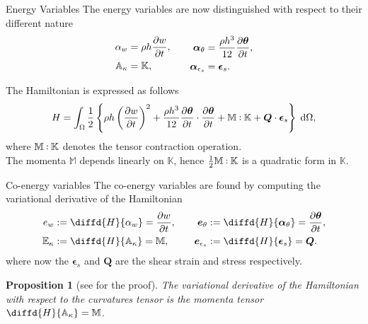 \documentclass{beamer}
\newtheorem{proposition}{Proposition}
\def\onedot{$\mathsurround0pt\ldotp$}
\def\cddot{%
	\mathbin{\vcenter{\baselineskip.67ex
			\hbox{\onedot}\hbox{\onedot}}%
}}
\begin{document}
\begin{frame}{Energy Variables}
The energy variables are now distinguished with respect to their different nature
\begin{equation*}
\begin{aligned}
\alpha_w &= \rho h \diffp{w}{t}, \\
\mathbb{A}_{\kappa} &= \mathbb{K}, \\
\end{aligned} \qquad
\begin{aligned}
\bm\alpha_{\theta} &= \frac{\rho h^3}{12} \diffp{\bm{\theta}}{t}, \\
\bm\alpha_{\epsilon_s} &= \bm{\epsilon}_s. \\
\end{aligned}
\end{equation*}

The Hamiltonian is expressed as follows 
\begin{equation*}
H = \int_{\Omega} \frac{1}{2} \left\{ \rho h \left(\diffp{w}{t} \right)^2 + \frac{\rho h^3}{12} \diffp{\bm{\theta}}{t} \cdot  \diffp{\bm{\theta}}{t} +   \mathbb{M} \cddot \mathbb{K} + \bm{Q} \cdot \bm{\epsilon}_s  \right\}  \d\Omega, 
\end{equation*}
	where $\mathbb{M} \cddot \mathbb{K}$ denotes the tensor contraction operation. \\ The momenta $\mathbb{M}$ depends linearly on $\mathbb{K}$, hence $\frac{1}{2} \mathbb{M} \cddot \mathbb{K}$ is a quadratic form in $\mathbb{K}$.
\end{frame}

\begin{frame}{Co-energy variables}
The co-energy variables are found by computing the variational derivative of the Hamiltonian
\begin{equation*}
\begin{aligned}
e_w &:= \diffd{H}{\alpha_w} = \diffp{w}{t},  \\
\mathbb{E}_{\kappa} &:= \diffd{H}{\mathbb{A}_{\kappa}} = \mathbb{M}, \\
\end{aligned} \qquad
\begin{aligned}
\bm{e}_{\theta} &:= \diffd{H}{\bm\alpha_{\theta}} = \diffp{\bm{\theta}}{t}, \\
\bm{e}_{\epsilon_s} &:= \diffd{H}{\bm{\epsilon}_s} = \bm{Q}. \\
\end{aligned}
\end{equation*}
where now the $\bm{\epsilon}_s$ and $\bm{Q}$ are the shear strain and stress respectively. 
\begin{proposition}[see \cite{BrugnoliMin} for the proof]
	The variational derivative of the Hamiltonian with respect to the curvatures tensor is the momenta tensor $\diffd{H}{\mathbb{A}_{\kappa}} = \mathbb{M}$.
\end{proposition}
\end{frame}
\end{document}
